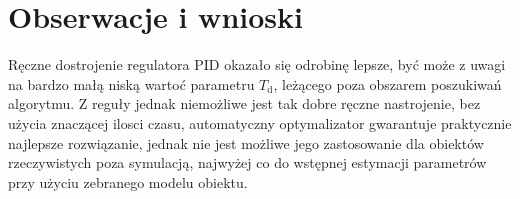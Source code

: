 \section{Obserwacje i wnioski}

Ręczne dostrojenie regulatora PID okazało się odrobinę lepsze, być może z uwagi na bardzo małą niską wartoć parametru $T_{\mathrm{d}}$, leżącego poza obszarem poszukiwań algorytmu. Z reguły jednak niemożliwe jest tak dobre ręczne nastrojenie, bez użycia znaczącej ilosci czasu, automatyczny optymalizator gwarantuje praktycznie najlepsze rozwiązanie, jednak nie jest możliwe jego zastosowanie dla obiektów rzeczywistych poza symulacją, najwyżej co do wstępnej estymacji parametrów przy użyciu zebranego modelu obiektu.

